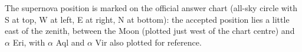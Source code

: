 The supernova position is marked on the official answer chart (all-sky
circle with S at top, W at left, E at right, N at bottom): the accepted
position lies a little east of the zenith, between the Moon (plotted just
west of the chart centre) and $\alpha$ Eri, with $\alpha$ Aql and
$\alpha$ Vir also plotted for reference.


